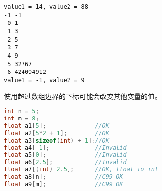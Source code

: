 \begin{frame}[fragile]
\begin{lstlisting}[backgroundcolor=\color{red!20}]
value1 = 14, value2 = 88
-1 -1
 0 1
 1 3
 2 5
 3 7
 4 9
 5 32767
 6 424094912
value1 = -1, value2 = 9
\end{lstlisting}
使用超过数组边界的下标可能会改变其他变量的值。
\end{frame}

\begin{frame}[fragile]
\begin{lstlisting}[language=c,backgroundcolor=\color{red!20}]
int n = 5;                     
int m = 8;                     
float a1[5];              //OK
float a2[5*2 + 1];        //OK
float a3[sizeof(int) + 1];//OK
float a4[-1];             //Invalid
float a5[0];              //Invalid
float a6[2.5];            //Invalid
float a7[(int) 2.5];      //OK, float to int
float a8[n];              //C99 OK
float a9[m];              //C99 OK
\end{lstlisting}
\end{frame}


